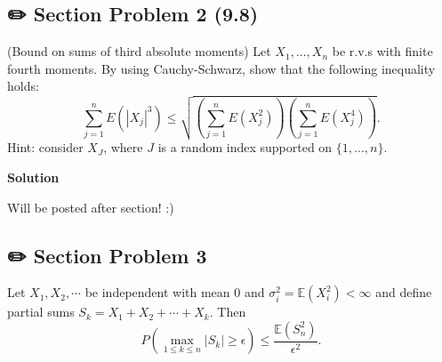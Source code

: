 \documentclass[
  letterpaper,
  DIV=11,
  numbers=noendperiod]{scrreprt}
\newcommand{\E}{\mathbb{E}}
\theoremstyle{definition}
\theoremstyle{plain}
\theoremstyle{remark}
\begin{document}
\hypertarget{section-problem-2-9.8}{%
\subsection*{✏️ Section Problem 2 (9.8)}\label{section-problem-2-9.8}}

(Bound on sums of third absolute moments) Let \(X_{1} ,\dotsc ,X_{n}\)
be r.v.s with finite fourth moments. By using Cauchy-Schwarz, show that
the following inequality holds: \begin{equation*}
\sum _{j=1}^{n} E(|X_{j} |^{3} )\leq \sqrt{\left(\sum _{j=1}^{n} E(X_{j}^{2} )\right)\left(\sum _{j=1}^{n} E(X_{j}^{4} )\right)} .
\end{equation*} Hint: consider \(X_{J}\), where \(J\) is a random index
supported on \(\{1,\dotsc ,n\}\).

\begin{tcolorbox}[enhanced jigsaw, opacityback=0, colback=white, leftrule=.75mm, bottomrule=.15mm, arc=.35mm, rightrule=.15mm, breakable, left=2mm, toprule=.15mm, colframe=quarto-callout-tip-color-frame]
\begin{minipage}[t]{5.5mm}
\textcolor{quarto-callout-tip-color}{\faLightbulb}
\end{minipage}%
\begin{minipage}[t]{\textwidth - 5.5mm}

\textbf{Solution}\vspace{2mm}

Will be posted after section! :)

\end{minipage}%
\end{tcolorbox}

\hypertarget{section-problem-3-5}{%
\subsection*{✏️ Section Problem 3}\label{section-problem-3-5}}

Let \(X_1,X_2,\cdots\) be independent with mean 0 and
\(\sigma^2_i = \E\left(X_i^2\right) < \infty\) and define partial sums
\(S_k = X_1 + X_2 + \cdots + X_k.\) Then \begin{equation}
P\left( \max_{1\leq k \leq n} |S_k| \geq \epsilon \right) \leq \frac{\E\left(S_n^2\right)}{\epsilon^2}. 
\end{equation}
\end{document}
